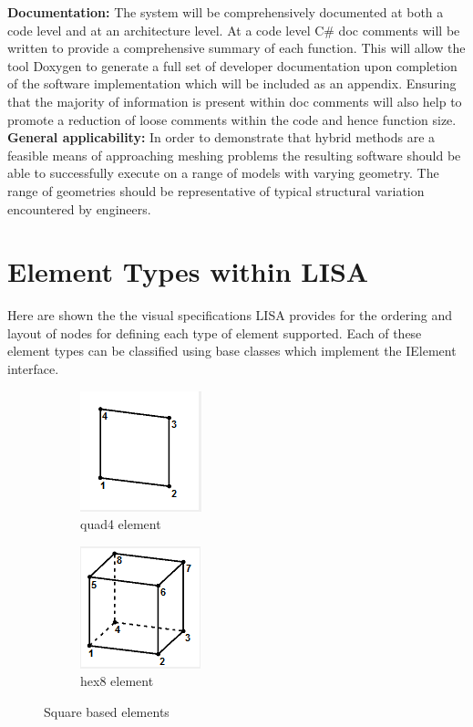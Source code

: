 \noindent
\textbf{Documentation:} The system will be comprehensively documented at both a code level and at an architecture level. At a code level C\# doc comments will be written to provide a comprehensive summary of each function. This will allow the tool Doxygen \cite{Doxygen} to generate a full set of developer documentation upon completion of the software implementation which will be included as an appendix. Ensuring that the majority of information is present within doc comments will also help to promote a reduction of loose comments within the code and hence function size. \\

\noindent
\textbf{General applicability:} In order to demonstrate that hybrid methods are a feasible means of approaching meshing problems the resulting software should be able to successfully execute on a range of models with varying geometry. The range of geometries should be representative of typical structural variation encountered by engineers.

\newpage
\section{Element Types within LISA}
Here are shown the the visual specifications LISA provides for the ordering and layout of nodes for defining each type of element supported. Each of these element types can be classified using base classes which implement the IElement interface.

\begin{figure}[!h]
\centering
\begin{subfigure}{.5\textwidth}
  \centering
  \includegraphics[width=0.3\linewidth]{../Graphics/LISA-quad4.png}
  \caption{quad4 element}
  \label{fig:sub1}
\end{subfigure}%
\begin{subfigure}{.5\textwidth}
  \centering
  \includegraphics[width=0.3\linewidth]{../Graphics/LISA-hex8.png}
  \caption{hex8 element}
  \label{fig:sub2}
\end{subfigure}
\label{fig:test}
\caption{Square based elements}
\end{figure}


